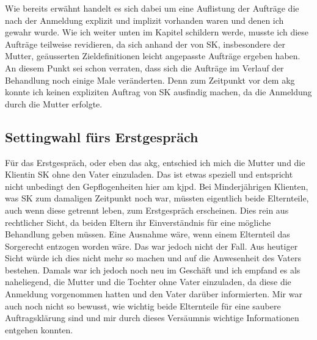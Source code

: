 Wie bereits erwähnt handelt es sich dabei um eine Auflistung der Aufträge die nach der Anmeldung explizit und implizit vorhanden waren und denen ich gewahr wurde. Wie ich weiter unten im Kapitel  schildern werde, musste ich diese Aufträge teilweise revidieren, da sich anhand der von SK, insbesondere der Mutter, geäusserten Zieldefinitionen leicht angepasste Aufträge ergeben haben. An diesem Punkt sei schon verraten, dass sich die Aufträge im Verlauf der Behandlung noch einige Male veränderten. Denn zum Zeitpunkt vor dem \ac{akg} konnte ich keinen expliziten Auftrag von SK ausfindig machen, da die Anmeldung durch die Mutter erfolgte. 

\subsection{Settingwahl fürs Erstgespräch} 
Für das Erstgespräch, oder eben das \ac{akg}, entschied ich mich die Mutter und die Klientin SK ohne den Vater einzuladen. Das ist etwas speziell und entspricht nicht unbedingt den Gepflogenheiten hier am \ac{kjpd}. Bei Minderjährigen Klienten, was SK zum damaligen Zeitpunkt noch war, müssten eigentlich beide Elternteile, auch wenn diese getrennt leben, zum Erstgespräch erscheinen. Dies rein aus rechtlicher Sicht, da beiden Eltern ihr Einverständnis für eine mögliche Behandlung geben müssen. Eine Ausnahme wäre, wenn einem Elternteil das Sorgerecht entzogen worden wäre. Das war jedoch nicht der Fall. Aus heutiger Sicht würde ich dies nicht mehr so machen und auf die Anwesenheit des Vaters bestehen. Damals war ich jedoch noch neu im Geschäft und ich empfand es als naheliegend, die Mutter und die Tochter ohne Vater einzuladen, da diese die Anmeldung vorgenommen hatten und den Vater darüber informierten. Mir war auch noch nicht so bewusst, wie wichtig beide Elternteile für eine saubere Auftragsklärung sind und mir durch dieses Versäumnis wichtige Informationen entgehen konnten.










